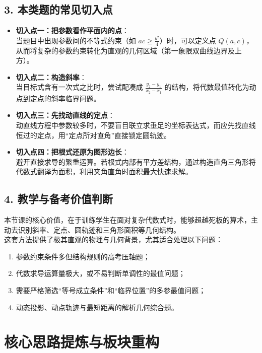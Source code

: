 \documentclass[11pt,a4paper]{ctexart}
\begin{document}
\subsection{3. 本类题的常见切入点}

\begin{itemize}
  \item \textbf{切入点一：把参数看作平面内的点}：\\
        当题目中出现参数间的不等式约束（如 $ac \ge \frac{b^2}{4}$）时，可以定义点 $Q(a,c)$，从而将复杂的参数约束转化为直观的几何区域（第一象限双曲线边界及上方）。
  \item \textbf{切入点二：构造斜率}：\\
        当目标式含有一次式之比时，尝试配凑成 $\frac{y_2-y_1}{x_2-x_1}$ 的结构，将代数最值转化为动点到定点的斜率临界问题。
  \item \textbf{切入点三：先找动直线的定点}：\\
        动直线方程中参数较多时，不要盲目联立求垂足的坐标表达式，而应先找直线恒过的定点，用“定点所对直角”直接锁定圆轨迹。
  \item \textbf{切入点四：把根式还原为图形边长}：\\
        避开直接求导的繁重运算。若根式内部有平方差结构，通过构造直角三角形将代数式翻译为面积，利用夹角直角时面积最大快速求解。
\end{itemize}

\subsection{4. 教学与备考价值判断}

本节课的核心价值，在于训练学生在面对复杂代数式时，能够超越死板的算术，主动去识别斜率、定点、圆轨迹和三角形面积等几何结构。\\
这套方法提供了极其直观的物理与几何背景，尤其适合处理以下问题：
\begin{enumerate}[label=\arabic*., leftmargin=2em, itemsep=0.1em]
  \item 参数约束条件多但结构规则的高考压轴题；
  \item 代数求导运算量极大，或不易判断单调性的最值问题；
  \item 需要严格筛选“等号成立条件”和“临界位置”的多参最值问题；
  \item 动态投影、动点轨迹与最短距离的解析几何综合题。
\end{enumerate}

\newpage

\section{核心思路提炼与板块重构}
\end{document}

